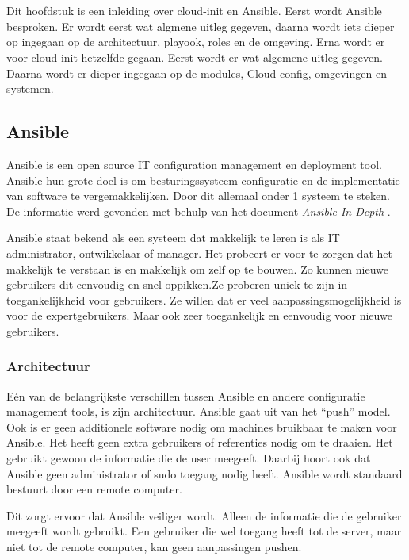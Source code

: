 \chapter{}
\label{ch:inleidingtotansibleencloudinit}

Dit hoofdstuk is een inleiding over cloud-init en Ansible. Eerst wordt Ansible besproken. Er wordt eerst wat algmene uitleg gegeven, daarna wordt iets dieper op ingegaan op de architectuur, playook, roles en de omgeving. Erna wordt er voor cloud-init hetzelfde gegaan. Eerst wordt er wat algemene uitleg gegeven. Daarna wordt er dieper ingegaan op de modules, Cloud config, omgevingen en systemen.


\section{Ansible}
Ansible is een open source IT configuration management en deployment tool. Ansible hun grote doel is om besturingssysteem configuratie en de implementatie van software te vergemakkelijken. Door dit allemaal onder 1 systeem te steken. De informatie werd gevonden met behulp van het document \textit{Ansible In Depth} \autocite{ansibleid}.

Ansible staat bekend als een systeem dat makkelijk te leren is als IT administrator, ontwikkelaar of manager. Het probeert er voor te zorgen dat het makkelijk te verstaan is en makkelijk om zelf op te bouwen. Zo kunnen nieuwe gebruikers dit eenvoudig en snel oppikken.Ze proberen uniek te zijn in toegankelijkheid voor gebruikers. Ze willen dat er veel aanpassingsmogelijkheid is voor de expertgebruikers. Maar ook zeer toegankelijk en eenvoudig voor nieuwe gebruikers.

\subsection{Architectuur}
Eén van de belangrijkste verschillen tussen Ansible en andere configuratie management tools, is zijn architectuur. Ansible gaat uit van het ``push'' model. Ook is er geen additionele software nodig om machines bruikbaar te maken voor Ansible. Het heeft geen extra gebruikers of referenties nodig om te draaien. Het gebruikt gewoon de informatie die de user meegeeft. Daarbij hoort ook dat Ansible geen administrator of sudo toegang nodig heeft. Ansible wordt standaard bestuurt door een remote computer.

Dit zorgt ervoor dat Ansible veiliger wordt. Alleen de informatie die de gebruiker meegeeft wordt gebruikt. Een gebruiker die wel toegang heeft tot de server, maar niet tot de remote computer, kan geen aanpassingen pushen.

